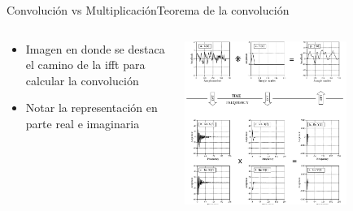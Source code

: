 \begin{frame}[t]{Convolución vs Multiplicación}{Teorema de la convolución}
   \begin{columns}[t]
      \begin{column}{.5\textwidth}
         \begin{itemize}
            \item{Imagen en donde se destaca el camino de la ifft para calcular la convolución}
            \item{Notar la representación en parte real e imaginaria}
         \end{itemize}
      \end{column}
      \hspace{2pt}
      \vrule
      \hspace{2pt}
      \begin{column}{.5\textwidth}
         \center\includegraphics[width=0.7\textwidth]{5_clase/teorema_conv1}
      \end{column}
      \hspace{2pt}
   \end{columns}
   \vfill
\end{frame}
